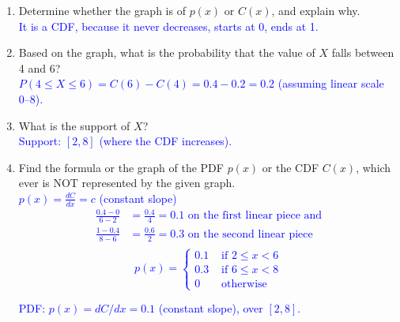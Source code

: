 \documentclass[10pt]{article}
\begin{document}
\begin{enumerate}
    \item[(a)] Determine whether the graph is of $p(x)$ or $C(x)$, and explain why. \\
        \textcolor{blue}{It is a CDF, because it never decreases, starts at 0, ends at 1.}

    \vfill    
    

     \item[(b)] Based on the graph, what is the probability that the value of $X$ falls between 4 and 6?\\
     \textcolor{blue}{$P(4\le X \le 6)=C(6)-C(4)=0.4-0.2=0.2$ (assuming linear scale 0–8).}
         \item[(c)] What is the support of $X$?\\
         \textcolor{blue}{Support: $[2,8]$ (where the CDF increases).}
         \vfill
         
     \item[(d)] Find the formula or the graph of the PDF $p(x)$ or the CDF $C(x)$, which ever is NOT represented by the given graph.\\
\textcolor{blue}{$p(x)=\frac{dC}{dx} = c$ (constant slope)
\begin{align*}
\frac{0.4 - 0}{6-2} &= \frac{0.4}{4} = 0.1 \text{ on the first linear piece and}\\
\frac{1 - 0.4}{8-6} &= \frac{0.6}{2} = 0.3 \text{ on the second linear piece}\\
\end{align*}
\[p(x) = 
\begin{cases}
   0.1  &  \text{ if $2\leq x < 6$}\\
   0.3  & \text{ if $6\leq x < 8$}\\
   0 & \text{ otherwise}
\end{cases}
\]
}
\medskip






     
     \textcolor{blue}{PDF: $p(x)=dC/dx = 0.1$ (constant slope), over $[2,8]$.
     
     
     
     
     
     }
     \vfill
    \end{enumerate}
\end{document}
